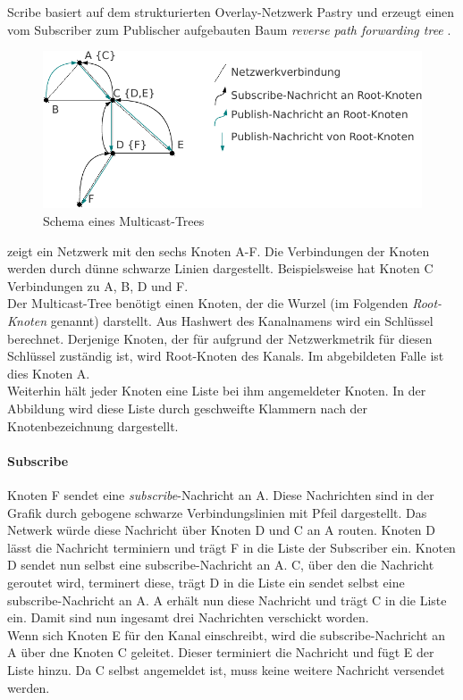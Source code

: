 Scribe basiert auf dem strukturierten Overlay-Netzwerk Pastry \cite{Rowstron2001} und erzeugt einen vom Subscriber zum Publischer aufgebauten Baum \emph{reverse path forwarding tree} \cite{Dalal1978}.

\begin{figure}[htbp]
\centering
\includegraphics{grafics/multicast_tree.pdf}
\caption{Schema eines Multicast-Trees}
\label{fig:multicast_tree}
\end{figure}

 zeigt ein Netzwerk mit den sechs Knoten A-F. Die Verbindungen der Knoten werden durch dünne schwarze Linien dargestellt. Beispielsweise hat Knoten C Verbindungen zu A, B, D und F.\\
Der Multicast-Tree benötigt einen Knoten, der die Wurzel (im Folgenden \emph{Root-Knoten} genannt) darstellt. Aus Hashwert des Kanalnamens wird ein Schlüssel berechnet. Derjenige Knoten, der für aufgrund der Netzwerkmetrik für diesen Schlüssel zuständig ist, wird Root-Knoten des Kanals. Im abgebildeten Falle ist dies Knoten A.\\
Weiterhin hält jeder Knoten eine Liste bei ihm angemeldeter Knoten. In der Abbildung wird diese Liste durch geschweifte Klammern nach der Knotenbezeichnung dargestellt.

\paragraph*{Subscribe}
Knoten F sendet eine \emph{subscribe}-Nachricht an A. Diese Nachrichten sind in der Grafik durch gebogene schwarze Verbindungslinien mit Pfeil dargestellt. Das Netwerk würde diese Nachricht über Knoten D und C an A routen. Knoten D lässt die Nachricht terminiern und trägt F in die Liste der Subscriber ein. Knoten D sendet nun selbst eine subscribe-Nachricht an A. C, über den die Nachricht geroutet wird, terminert diese, trägt D in die Liste ein sendet selbst eine subscribe-Nachricht an A. A erhält nun diese Nachricht und trägt C in die Liste ein. Damit sind nun ingesamt drei Nachrichten verschickt worden.\\
Wenn sich Knoten E für den Kanal einschreibt, wird die subscribe-Nachricht an A über dne Knoten C geleitet. Dieser terminiert die Nachricht und fügt E der Liste hinzu. Da C selbst angemeldet ist, muss keine weitere Nachricht versendet werden.

